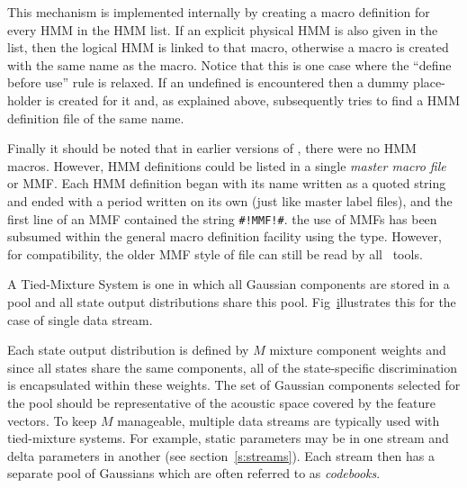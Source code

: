 This mechanism is implemented internally by creating a  macro
definition for every HMM in the HMM list.  If an explicit physical HMM
is also given in the list, then the logical HMM is linked to 
that macro, otherwise a  macro
is created with the same name as the  macro.  Notice that this is
one case where the ``define before use'' rule is relaxed.  If an undefined
 is encountered then a dummy place-holder is created for it and,
as explained above,
 subsequently tries to find a HMM definition 
file of the same name.

Finally it should be noted that 
in earlier versions of \HTK, there were no HMM macros.  However,
HMM definitions could be listed in a single 
\textit{master macro file} or MMF.  Each HMM definition began
with its name written as a quoted string and ended with a period
written on its own (just like master label files), and  the first
line of an MMF contained the string \texttt{\#!MMF!\#}.  \inthisversion
the use of MMFs has been subsumed within the general macro
definition facility using the  type.
However, for compatibility, the older MMF style of file can still be
read by all \HTK\ tools.


A Tied-Mixture System is one in which all 
Gaussian components are stored in
a pool and all state output distributions share this pool.  Fig~\href{f:tmixeg}
illustrates this for the case of single data stream.  

Each state output distribution is defined by $M$
mixture component weights and since all states share the same components,
all of the state-specific discrimination  is encapsulated within these
weights.  The set of Gaussian components selected for the pool
should be representative of the acoustic space covered by the feature
vectors.  To keep $M$ manageable, multiple data streams are typically
used with tied-mixture systems.  For example, static parameters may
be in one stream and delta parameters in another (see section~\ref{s:streams}).
Each stream then has a separate pool of Gaussians which are often referred
to as \textit{codebooks}.

